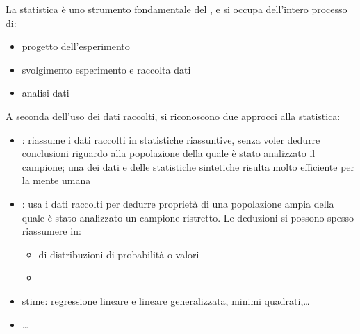 \documentclass[letterpaper,10pt,italian]{jupyterBook}
\begin{document}
\sphinxAtStartPar
La statistica è uno strumento fondamentale del , e si occupa dell’intero processo di:
\begin{itemize}
\item {} 
\sphinxAtStartPar
progetto dell’esperimento

\item {} 
\sphinxAtStartPar
svolgimento esperimento e raccolta dati

\item {} 
\sphinxAtStartPar
analisi dati

\end{itemize}

\sphinxAtStartPar
A seconda dell’uso dei dati raccolti, si riconoscono due approcci alla statistica:
\begin{itemize}
\item {} 
\sphinxAtStartPar
{}: riassume i dati raccolti in statistiche riassuntive, senza voler dedurre conclusioni riguardo alla popolazione della quale è stato analizzato il campione; una  dei dati e delle statistiche sintetiche risulta molto efficiente per la mente umana

\sphinxAtStartPar
{} 

\item {} 
\sphinxAtStartPar
{}: usa i dati raccolti per dedurre proprietà di una popolazione ampia della quale è stato analizzato un campione ristretto. Le deduzioni si possono spesso riassumere in:
\begin{itemize}
\item {} 
\sphinxAtStartPar
{} di distribuzioni di probabilità o valori

\item {} 
\sphinxAtStartPar
{}

\end{itemize}

\end{itemize}

\sphinxAtStartPar
{} 
\begin{itemize}
\item {} 
\sphinxAtStartPar
stime: regressione lineare e lineare generalizzata, minimi quadrati,…

\item {} 
\sphinxAtStartPar
…

\end{itemize}
\end{document}
